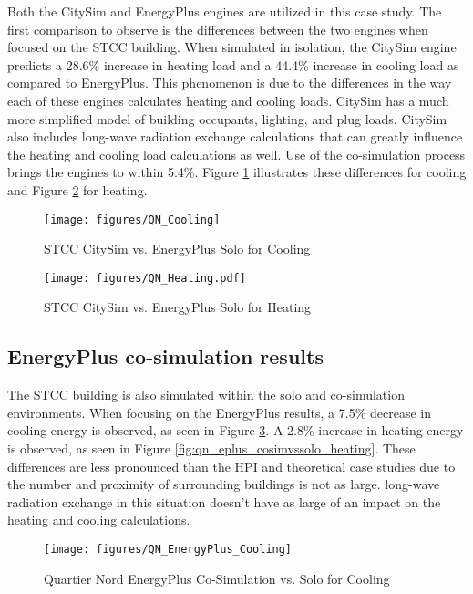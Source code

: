 \documentclass{tBPS2e}
\theoremstyle{plain}
\theoremstyle{definition}
\theoremstyle{remark}
\begin{document}
Both the CitySim and EnergyPlus engines are utilized in this case study. The
first comparison to observe is the differences between the two engines when
focused on the STCC building. When simulated in isolation, the
CitySim engine predicts a 28.6\% increase in heating load and a 44.4\%
increase in cooling load as compared to EnergyPlus. This phenomenon is due to
the differences in the way each of these engines calculates heating and
cooling loads. CitySim has a much more simplified model of building occupants,
lighting, and plug loads. CitySim also includes long-wave radiation exchange calculations
that can greatly influence the heating and cooling load calculations as well.
 Use of the co-simulation process brings the engines to within
5.4\%. Figure \ref{fig:qn_eplusvscitysim_cooling} illustrates these
differences for cooling and Figure \ref{fig:qn_eplusvscitysim_heating} for
heating.

\begin{figure}[H]
\centering
\texttt{[image: figures/QN\_Cooling]}
\caption{STCC CitySim vs. EnergyPlus Solo for Cooling}
\label{fig:qn_eplusvscitysim_cooling}
\end{figure}

\begin{figure}[H]
\centering
\texttt{[image: figures/QN\_Heating.pdf]}
\caption{STCC CitySim vs. EnergyPlus Solo for Heating}
\label{fig:qn_eplusvscitysim_heating}
\end{figure}


\subsection{EnergyPlus co-simulation results}
The STCC building is also simulated within the solo and
co-simulation environments. When
focusing on the EnergyPlus results, a 7.5\% decrease in cooling energy is
observed, as seen in Figure
\ref{fig:qn_eplus_cosimvssolo_cooling}. A 2.8\% increase in heating energy is
observed, as seen in Figure
\ref{fig:qn_eplus_cosimvssolo_heating}. These differences are less pronounced
than the HPI and theoretical case studies due to the number and proximity of
surrounding buildings is not as large. long-wave radiation exchange in this situation doesn't have as large of an impact on the heating and cooling calculations.


\begin{figure}[H]
\centering
\texttt{[image: figures/QN\_EnergyPlus\_Cooling]}
\caption{Quartier Nord EnergyPlus Co-Simulation vs. Solo for Cooling}
\label{fig:qn_eplus_cosimvssolo_cooling}
\end{figure}
\end{document}
